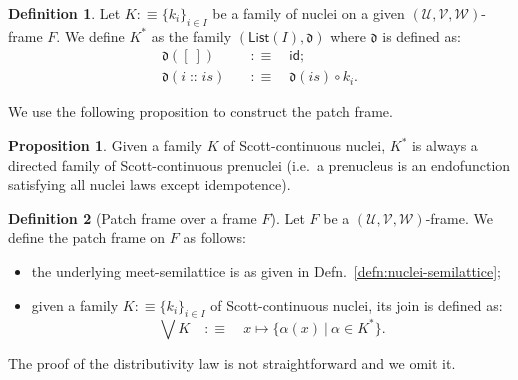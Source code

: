 \documentclass[a4paper, 11pt]{article}
\theoremstyle{definition}
\newtheorem{prop}{Proposition}
\newtheorem{defn}{Definition}
\DeclareMathOperator{\cons}{\mathtt{::}}
\newcommand{\UU}{\mathcal{U}}
\newcommand{\VV}{\mathcal{V}}
\newcommand{\WW}{\mathcal{W}}
\begin{document}
\begin{defn}
  Let $K :\equiv \{ k_i \}_{i \in I}$ be a family of nuclei on a given
  $(\UU, \VV, \WW)$-frame $F$. We define $K^*$ as
  the family $(\mathsf{List}(I), \mathfrak{d})$ where $\mathfrak{d}$ is defined
  as:
  \begin{align*}
    \mathfrak{d}(\mathtt{[\ ]})      \quad&:\equiv\quad \mathsf{id}; \\
    \mathfrak{d}(i \cons is) \quad&:\equiv\quad \mathfrak{d}(is) \circ k_i.
  \end{align*}
\end{defn}

We use the following proposition to construct the patch frame.

\begin{prop}
  Given a family $K$ of Scott-continuous nuclei, $K^*$ is always a directed
  family of Scott-continuous prenuclei (i.e.\ a prenucleus is an endofunction
  satisfying all nuclei laws except idempotence).
\end{prop}

\begin{defn}[Patch frame over a frame $F$]
  Let $F$ be a $(\UU, \VV, \WW)$-frame. We define the patch frame on $F$ as
  follows:
  \begin{itemize}
    \item the underlying meet-semilattice is as given in
      Defn.~\ref{defn:nuclei-semilattice};
    \item given a family $K :\equiv \{ k_i \}_{i \in I}$ of Scott-continuous nuclei,
      its join is defined as:
      \begin{equation*}
        \bigvee K \quad:\equiv\quad x \mapsto \{ \alpha(x) ~|~ \alpha \in K^* \}.
      \end{equation*}
  \end{itemize}
  The proof of the distributivity law is not straightforward and we omit it.
\end{defn}

\printbibliography
\end{document}
